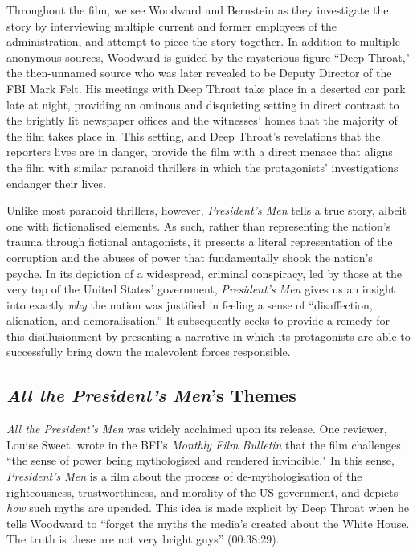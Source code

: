 Throughout the film, we see Woodward and Bernstein as they investigate the story by interviewing multiple current and former employees of the administration, and attempt to piece the story together.
In addition to multiple anonymous sources, Woodward is guided by the mysterious figure ``Deep Throat," the then-unnamed source who was later revealed to be Deputy Director of the FBI Mark Felt.
His meetings with Deep Throat take place in a deserted car park late at night, providing an ominous and disquieting setting in direct contrast to the brightly lit newspaper offices and the witnesses' homes that the majority of the film takes place in.
This setting, and Deep Throat's revelations that the reporters lives are in danger, provide the film with a direct menace that aligns the film with similar paranoid thrillers in which the protagonists' investigations endanger their lives.

Unlike most paranoid thrillers, however, \textit{President's Men} tells a true story, albeit one with fictionalised elements.
As such, rather than representing the nation's trauma through fictional antagonists, it presents a literal representation of the corruption and the abuses of power that fundamentally shook the nation's psyche.
In its depiction of a widespread, criminal conspiracy, led by those at the very top of the United States’ government, \textit{President’s Men} gives us an insight into exactly \textit{why }the nation was justified in feeling a sense of ``disaffection, alienation, and demoralisation.”\autocites[][296]{keathley_trapped_2004}
It subsequently seeks to provide a remedy for this disillusionment by presenting a narrative in which its protagonists are able to successfully bring down the malevolent forces responsible.


\subsection{\textit{All the President's Men}'s Themes} \label{sec:president-themes}

\textit{All the President's Men} was widely acclaimed upon its release.
One reviewer, Louise Sweet, wrote in the BFI's \textit{Monthly Film Bulletin} that the film challenges ``the sense of power being mythologised and rendered invincible."\autocites[][95]{sweet_all_1976}
In this sense, \textit{President’s Men} is a film about the process of de-mythologisation of the righteousness, trustworthiness, and morality of the US government, and depicts \textit{how} such myths are upended. 
This idea is made explicit by Deep Throat when he tells Woodward to ``forget the myths the media’s created about the White House. The truth is these are not very bright guys” (00:38:29).


